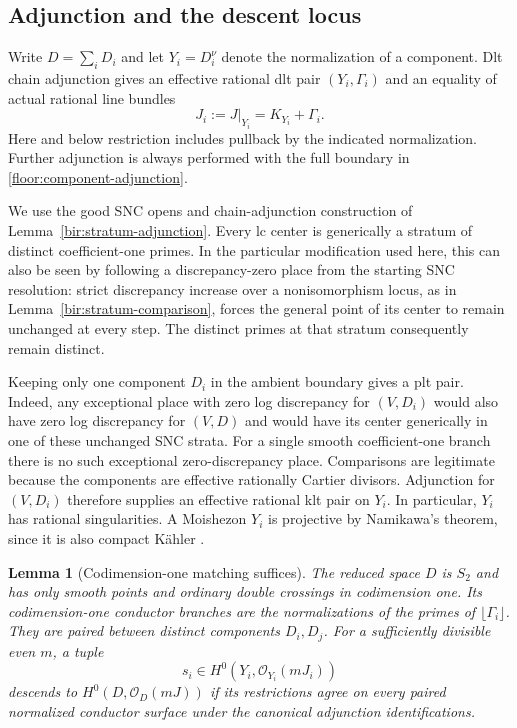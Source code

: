 \documentclass[11pt,letterpaper]{article}
\newtheorem{lemma}[theorem]{Lemma}
\theoremstyle{definition}
\theoremstyle{remark}
\begin{document}
\subsection{Adjunction and the descent locus}

Write $D=\sum_iD_i$ and let $Y_i=D_i^\nu$ denote the normalization of a
component.  Dlt chain adjunction gives an effective rational dlt pair
$(Y_i,\Gamma_i)$ and an equality of actual rational line bundles
\begin{equation}
 \label{floor:component-adjunction}
 J_i:=J|_{Y_i}=K_{Y_i}+\Gamma_i.
\end{equation}
Here and below restriction includes pullback by the indicated
normalization.  Further adjunction is always performed with the full
boundary in \eqref{floor:component-adjunction}.

We use the good SNC opens and chain-adjunction construction of
Lemma~\ref{bir:stratum-adjunction}.  Every lc center is
generically a stratum of distinct coefficient-one primes.  In the
particular modification used here, this can also be seen by following a
discrepancy-zero place from the starting SNC resolution: strict
discrepancy increase over a nonisomorphism locus, as in
Lemma~\ref{bir:stratum-comparison}, forces the general point
of its center to remain unchanged at every step.  The distinct primes at
that stratum consequently remain distinct.

Keeping only one component $D_i$ in the ambient boundary gives a plt
pair.  Indeed, any exceptional place with zero log discrepancy for
$(V,D_i)$ would also have zero log discrepancy for $(V,D)$ and would
have its center generically in one of these unchanged SNC strata.  For a
single smooth coefficient-one branch there is no such exceptional
zero-discrepancy place.  Comparisons are legitimate because the
components are effective rationally Cartier divisors.  Adjunction for
$(V,D_i)$ therefore supplies an effective rational klt pair on $Y_i$.
In particular, $Y_i$ has rational singularities.  A Moishezon $Y_i$ is
projective by Namikawa's theorem, since it is also compact K\"ahler
\cite{NamikawaProjectivity}.

\begin{lemma}[Codimension-one matching suffices]
\label{floor:descent}
The reduced space $D$ is $S_2$ and has only smooth points and ordinary
double crossings in codimension one.  Its codimension-one conductor
branches are the normalizations of the primes of
$\lfloor\Gamma_i\rfloor$.  They are paired between distinct components
$D_i,D_j$.  For a sufficiently divisible even $m$, a tuple
\[
 s_i\in H^0(Y_i,\mathcal{O}_{Y_i}(mJ_i))
\]
descends to $H^0(D,\mathcal{O}_D(mJ))$ if its restrictions agree on every paired
normalized conductor surface under the canonical adjunction
identifications.
\end{lemma}
\end{document}
